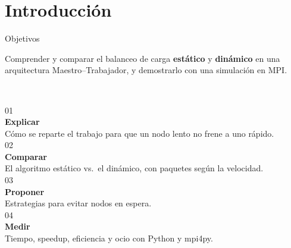 \documentclass[aspectratio=169,12pt,t]{beamer}
\newcommand{\kalamL}{}
\newcommand{\numeral}[2]{{\kalamL\fontsize{30}{32}\selectfont\color{#1}#2}}
\newcommand{\linea}{{\color{regla}\rule{\linewidth}{.5pt}}}
\begin{document}
\section{Introducción}
\begin{frame}{Objetivos}
{\kalamL\fontsize{15}{20}\selectfont Comprender y comparar el balanceo de carga \textbf{\color{estatico}estático} y \textbf{\color{dinamico}dinámico} en una arquitectura Maestro–Trabajador, y demostrarlo con una simulación en MPI.\par}
\vspace{.55cm}
\begin{columns}[T,onlytextwidth]
\column{.22\textwidth}\linea\\[3pt]\numeral{dinamico}{01}\\[2pt]\textbf{Explicar}\\[2pt]{\small\color{suave}Cómo se reparte el trabajo para que un nodo lento no frene a uno rápido.}
\column{.22\textwidth}\linea\\[3pt]\numeral{dinamico}{02}\\[2pt]\textbf{Comparar}\\[2pt]{\small\color{suave}El algoritmo estático vs.\ el dinámico, con paquetes según la velocidad.}
\column{.22\textwidth}\linea\\[3pt]\numeral{dinamico}{03}\\[2pt]\textbf{Proponer}\\[2pt]{\small\color{suave}Estrategias para evitar nodos en espera.}
\column{.22\textwidth}\linea\\[3pt]\numeral{dinamico}{04}\\[2pt]\textbf{Medir}\\[2pt]{\small\color{suave}Tiempo, speedup, eficiencia y ocio con Python y mpi4py.}
\end{columns}
\end{frame}

\end{document}
